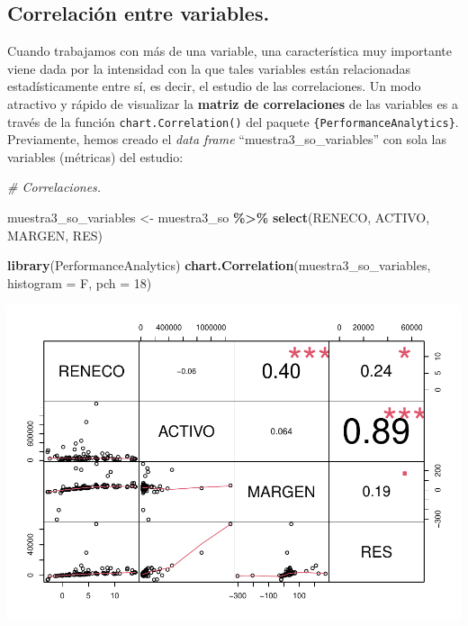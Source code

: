 \documentclass[
]{book}
\newenvironment{Shaded}{\begin{snugshade}}{\end{snugshade}}
\newcommand{\AttributeTok}[1]{\textcolor[rgb]{0.13,0.29,0.53}{#1}}
\newcommand{\CommentTok}[1]{\textcolor[rgb]{0.56,0.35,0.01}{\textit{#1}}}
\newcommand{\DecValTok}[1]{\textcolor[rgb]{0.00,0.00,0.81}{#1}}
\newcommand{\FunctionTok}[1]{\textcolor[rgb]{0.13,0.29,0.53}{\textbf{#1}}}
\newcommand{\NormalTok}[1]{#1}
\newcommand{\OtherTok}[1]{\textcolor[rgb]{0.56,0.35,0.01}{#1}}
\newcommand{\SpecialCharTok}[1]{\textcolor[rgb]{0.81,0.36,0.00}{\textbf{#1}}}
\let\Oldincludegraphics\includegraphics
\renewcommand{\includegraphics}[2][]{%
  \Oldincludegraphics[#1]{#2}%
}
\begin{document}
\subsection{Correlación entre variables.}\label{correlaciuxf3n-entre-variables.}

Cuando trabajamos con más de una variable, una característica muy importante viene dada por la intensidad con la que tales variables están relacionadas estadísticamente entre sí, es decir, el estudio de las correlaciones. Un modo atractivo y rápido de visualizar la \textbf{matriz de correlaciones} de las variables es a través de la función \texttt{chart.Correlation()} del paquete \texttt{\{PerformanceAnalytics\}}. Previamente, hemos creado el \emph{data frame} ``muestra3\_so\_variables'' con sola las variables (métricas) del estudio:

\begin{Shaded}
\begin{Highlighting}[]
\CommentTok{\# Correlaciones.}

\NormalTok{muestra3\_so\_variables }\OtherTok{\textless{}{-}}\NormalTok{ muestra3\_so }\SpecialCharTok{\%\textgreater{}\%}
  \FunctionTok{select}\NormalTok{(RENECO, ACTIVO, MARGEN, RES)}

\FunctionTok{library}\NormalTok{(PerformanceAnalytics)}
\FunctionTok{chart.Correlation}\NormalTok{(muestra3\_so\_variables, }\AttributeTok{histogram =}\NormalTok{ F, }\AttributeTok{pch =} \DecValTok{18}\NormalTok{)}
\end{Highlighting}
\end{Shaded}

\includegraphics{_main_files/figure-latex/unnamed-chunk-194-1.pdf}
\end{document}

